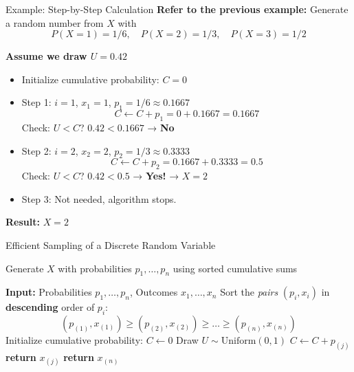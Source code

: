 \documentclass[8pt]{beamer}
\begin{document}
\begin{frame}{Example: Step-by-Step Calculation}
{\bf Refer to the previous example:} Generate a random number from $X$ with
\begin{equation*}
P(X=1)=1/6, \quad P(X=2)=1/3, \quad P(X=3)=1/2
\end{equation*}

\vspace{2mm}
\textbf{Assume we draw $U = 0.42$}

\begin{itemize}
    \item Initialize cumulative probability: $C = 0$
    \item Step 1: $i=1$, $x_1 = 1$, $p_1 = 1/6 \approx 0.1667$  
    \begin{equation*}
    C \gets C + p_1 = 0 + 0.1667 = 0.1667
    \end{equation*}
    Check: $U < C$? $0.42 < 0.1667$ → \textbf{No}
    \item Step 2: $i=2$, $x_2 = 2$, $p_2 = 1/3 \approx 0.3333$  
    \begin{equation*}
    C \gets C + p_2 = 0.1667 + 0.3333 = 0.5
    \end{equation*}
    Check: $U < C$? $0.42 < 0.5$ → \textbf{Yes!} → $X = 2$
    \item Step 3: Not needed, algorithm stops.
\end{itemize}

\vspace{1mm}
\textbf{Result:} $X = 2$

\end{frame}


\begin{frame}{Efficient Sampling of a Discrete Random Variable}
\begin{algorithm}[H]
    \caption{Generate $X$ with probabilities $p_1, \dots, p_n$ using sorted cumulative sums}
    \label{alg:discrete-cumsum-sorted}
    \begin{algorithmic}[1]
        \small
        \State \textbf{Input:} Probabilities $p_1, \dots, p_n$, Outcomes $x_1, \dots, x_n$
        \State Sort the \emph{pairs} $(p_i, x_i)$ in \textbf{descending} order of $p_i$:
        $$
            (p_{(1)}, x_{(1)}) \ge (p_{(2)}, x_{(2)}) \ge \dots \ge (p_{(n)}, x_{(n)})
        $$
        \State Initialize cumulative probability: $C \gets 0$
        \State Draw $U \sim \text{Uniform}(0,1)$
            \State $C \gets C + p_{(j)}$
                \State \textbf{return} $x_{(j)}$
            \EndIf
        \EndFor
        \State \textbf{return} $x_{(n)}$ 
    \end{algorithmic}
\end{algorithm}
\end{frame}
\end{document}
